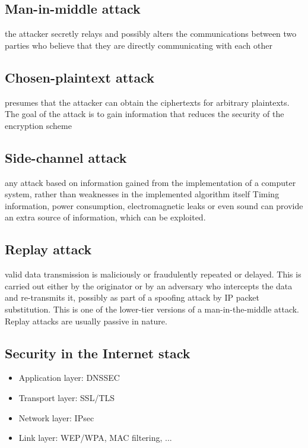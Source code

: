 \subsection{Man-in-middle attack}
the attacker secretly relays and possibly alters the communications between two parties who believe that they are directly communicating with each other
\subsection{Chosen-plaintext attack}
presumes that the attacker can obtain the ciphertexts for arbitrary plaintexts. The goal of the attack is to gain information that reduces the security of the encryption scheme
\subsection{Side-channel attack}
any attack based on information gained from the implementation of a computer system, rather than weaknesses in the implemented algorithm itself
Timing information, power consumption, electromagnetic leaks or even sound can provide an extra source of information, which can be exploited.
\subsection{Replay attack}
valid data transmission is maliciously or fraudulently repeated or delayed. This is carried out either by the originator or by an adversary who intercepts the data and re-transmits it, possibly as part of a spoofing attack by IP packet substitution. This is one of the lower-tier versions of a man-in-the-middle attack. Replay attacks are usually passive in nature.

\subsection{Security in the Internet stack}
\begin{itemize}
\item Application layer: DNSSEC
\item Transport layer: SSL/TLS
\item Network layer: IPsec
\item Link layer: WEP/WPA, MAC filtering, ...
\end{itemize}

